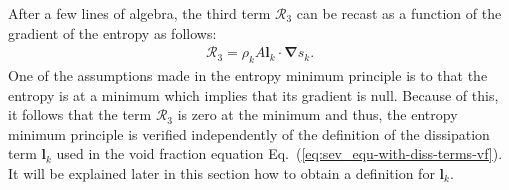 \documentclass[preprint,10pt]{elsarticle}
\newcommand{\grad}{\mbold{\nabla}}
\newcommand{\mbold}[1]{\boldsymbol#1}
\newcommand{\eqt}[1]{Eq.~(\ref{#1})}                     %
\begin{document}
%
After a few lines of algebra, the third term ${\mathcal{R}_3}$ can be recast as a function of the gradient of the entropy as follows:
\begin{align}
 \label{eq:ent-R3-sct4}
  \mathcal{R}_3  =  \rho_k A \mbold l_k \cdot \grad s_k.
\end{align} 
One of the assumptions made in the entropy minimum principle is to that the entropy 
is at a minimum which implies that its gradient is null. Because of this, it follows that
the term $\mathcal{R}_3$ is zero at the minimum and thus, the entropy minimum principle is verified
independently of the definition of the dissipation term $\mbold l_k$ used in the void fraction
equation \eqt{eq:sev_equ-with-diss-terms-vf}. It will be explained later in this section how to obtain a definition for $\mbold l_k$.
\end{document}
